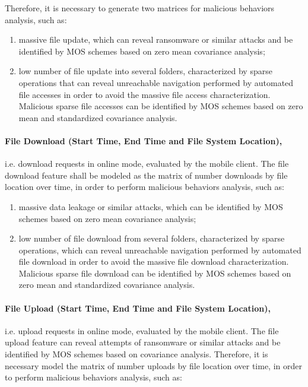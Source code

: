 \documentclass[twocolumn]{svjour3}          	%
\begin{document}
Therefore, it is necessary to generate two matrices for malicious behaviors analysis, such as: 

\begin{enumerate}[label=(\alph*)]
	\item massive file update, which can reveal ransomware or similar attacks and be identified by MOS schemes based on zero mean covariance analysis; 
	\item low number of file update into several folders, characterized by sparse operations that can reveal unreachable navigation performed by automated file accesses in order to avoid the massive file access characterization. Malicious sparse file accesses can be identified by MOS schemes based on zero mean and standardized covariance analysis.
\end{enumerate}

\paragraph{\textbf{File Download (Start Time, End Time and File System Location)},}i.e. download requests in online mode, evaluated by the mobile client. The file download feature shall be modeled as the matrix of number downloads by file location over time, in order to perform malicious behaviors analysis, such as:

\begin{enumerate}
	\item massive data leakage or similar attacks, which can be identified by MOS schemes based on zero mean covariance analysis;
	\item low number of file download from several folders, characterized by sparse operations, which can reveal unreachable navigation performed by automated file download in order to avoid the massive file download characterization. Malicious sparse file download can be identified by MOS schemes based on zero mean and standardized covariance analysis.
\end{enumerate}

\paragraph{\textbf{File Upload (Start Time, End Time and File System Location)},}i.e. upload requests in online mode, evaluated by the mobile client. The file upload feature can reveal attempts of ransomware or similar attacks and be identified by MOS schemes based on covariance analysis. Therefore, it is necessary model the matrix of number uploads by file location over time, in order to perform malicious behaviors analysis, such as:
\end{document}
